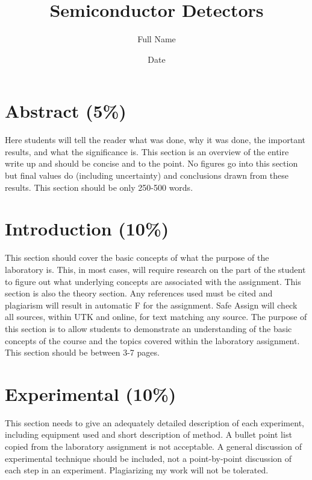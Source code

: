 \documentclass[12pt]{article}
\title{Semiconductor Detectors}
\author{Full Name}
\date{Date}
\begin{document}

\maketitle

\section{Abstract (5\%)}
Here students will tell the reader what was done, why it was done, the important results, and what the significance is. This section is an overview of the entire write up and should be concise and to the point. No figures go into this section but final values do (including uncertainty) and conclusions drawn from these results. This section should be only 250-500 words.

\section{Introduction (10\%)}
This section should cover the basic concepts of what the purpose of the laboratory is. This, in most cases, will require research on the part of the student to figure out what underlying concepts are associated with the assignment. This section is also the theory section. Any references used must be cited and plagiarism will result in automatic F for the assignment. Safe Assign will check all sources, within UTK and online, for text matching any source. The purpose of this section is to allow students to demonstrate an understanding of the basic concepts of the course and the topics covered within the laboratory assignment. This section should be between 3-7 pages.

\section{Experimental (10\%)}
This section needs to give an adequately detailed description of each experiment, including equipment used and short description of method. A bullet point list copied from the laboratory assignment is not acceptable. A general discussion of experimental technique should be included, not a point-by-point discussion of each step in an experiment. Plagiarizing my work will not be tolerated. 
\end{document}
